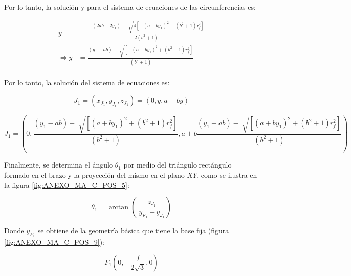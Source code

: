         \newpage
        
        Por lo tanto, la solución y para el sistema de ecuaciones de las circunferencias es:
        
        \begin{align*}
         y&= \frac{- \left( 2ab-2y_{1} \right) -\sqrt[]{4 \left[ - \left( a+by_{1} \right) ^{2}+ \left( b^{2}+1 \right) r_{f}^{2} \right] }}{2 \left( b^{2}+1 \right) } \\
         \Longrightarrow y&= \frac{ \left( y_{1}-ab \right) -\sqrt[]{ \left[ - \left( a+by_{1} \right) ^{2}+ \left( b^{2}+1 \right) r_{f}^{2} \right] }}{ \left( b^{2}+1 \right) } \\ 
        \end{align*}
        
        Por lo tanto, la solución del sistema de ecuaciones es:

        \begin{equation*}
         J_{1}= \left( x_{J_{1}},y_{J_{1}},z_{J_{1}} \right) = \left( 0,y,a+by \right) 
        \end{equation*}
        
        \begin{equation*}
         J_{1}= \left( 0,\frac{ \left( y_{1}-ab \right) -\sqrt[]{ \left[  \left( a+by_{1} \right) ^{2}+ \left( b^{2}+1 \right) r_{f}^{2} \right] }}{ \left( b^{2}+1 \right) },a+b\frac{ \left( y_{1}-ab \right) -\sqrt[]{ \left[  \left( a+by_{1} \right) ^{2}+ \left( b^{2}+1 \right) r_{f}^{2} \right] }}{ \left( b^{2}+1 \right) } \right)
        \end{equation*}
        
        Finalmente, se determina el ángulo $\theta _{1}$ por medio del triángulo rectángulo formado en el brazo y la proyección del mismo en el plano $XY$, como se ilustra en la figura \ref{fig:ANEXO_MA_C_POS_5}:
        

        \begin{equation*}
         \theta _{1}=\arctan  \left( ~\frac{z_{J_{1}}}{y_{F_{1}}-y_{J_{1}}} \right)  
        \end{equation*}

        
        Donde  $y_{F_{1}}$ se obtiene de la geometría básica que tiene la base fija (figura \ref{fig:ANEXO_MA_C_POS_9}):

        \begin{equation*}
            F_1(0,-\frac{f}{2\sqrt{3}},0)
        \end{equation*}
        
